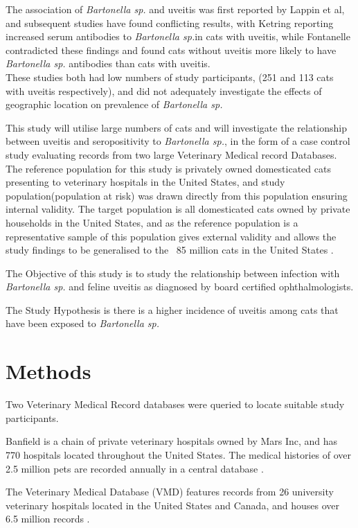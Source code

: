 \documentclass[11pt,twocolumn]{article}
\begin{document}
		The association of \emph{Bartonella sp.} and uveitis was first reported by Lappin et al\cite{Lappin1999}, and subsequent studies have found conflicting results, with Ketring reporting increased serum antibodies to \emph{Bartonella sp.}in cats with uveitis\cite{Ketring2004}, while Fontanelle contradicted these findings and found cats without uveitis more likely to have \emph{Bartonella sp.} antibodies than cats with uveitis.\\
		These studies both had low numbers of study participants, (251 and 113 cats with uveitis respectively), and did not adequately investigate the effects of geographic location on prevalence of \emph{Bartonella sp.}
	
		This study will utilise large numbers of cats and will investigate the relationship between uveitis and seropositivity to  \emph{Bartonella sp.}, in the form of a case control study evaluating records from two large Veterinary Medical record Databases. \cite{bark12,UniversityVeterinary}	
		The reference population for this study is privately owned domesticated cats presenting to veterinary hospitals in the United States, and study population(population at risk)  was drawn directly from this population ensuring internal validity.
		The target population is all domesticated cats owned by private households in the United States, and as the reference population is a representative sample of this population gives external validity and allows the study findings to be generalised to the ~85 million cats in the United States \cite{HSUSown}.
		

			The Objective of this study is to study the relationship between infection with \emph{Bartonella sp.} and feline uveitis as diagnosed by board certified ophthalmologists.


			The Study Hypothesis is there is a higher incidence of uveitis among cats that have been exposed to \emph{Bartonella sp.}
\section{Methods}
	Two Veterinary Medical Record databases were queried to locate suitable study participants.


	Banfield is a chain of private veterinary hospitals owned by Mars Inc, and has 770 hospitals located throughout the United States.
	The medical histories of over 2.5 million pets are recorded annually in a central database \cite{bark12}.


	The Veterinary Medical Database (VMD) features records from 26 university veterinary hospitals located in the United States and Canada, and houses over 6.5 million records \cite{UniversityVeterinary}.
	
\end{document}
